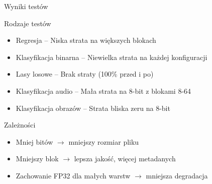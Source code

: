 \documentclass{beamer}
\begin{document}
\begin{frame}{Wyniki testów}
    \begin{block}{Rodzaje testów}
        \begin{itemize}
            \item Regresja -- Niska strata na większych blokach
            \item Klasyfikacja binarna -- Niewielka strata na każdej konfiguracji
            \item Lasy losowe -- Brak straty (100\% przed i po)
            \item Klasyfikacja audio -- Mała strata na 8-bit z blokami 8-64
            \item Klasyfikacja obrazów -- Strata bliska zeru na 8-bit
        \end{itemize}
    \end{block}
    
    \begin{block}{Zależności}
        \begin{itemize}
            \item Mniej bitów $\rightarrow$ mniejszy rozmiar pliku
            \item Mniejszy blok $\rightarrow$ lepsza jakość, więcej metadanych
            \item Zachowanie FP32 dla małych warstw $\rightarrow$ mniejsza degradacja
        \end{itemize}
    \end{block}
\end{frame}
\end{document}

